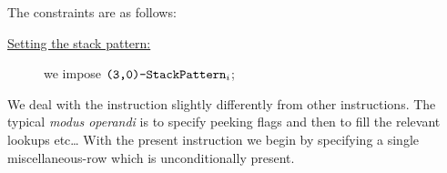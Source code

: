 \begin{center}
\end{center}
The constraints are as follows:
\begin{description}
	\item[\underline{Setting the stack pattern:}]
		we impose $\texttt{(3,0)-}\texttt{StackPattern}_{i}$;
\end{description}
We deal with the  instruction slightly differently from other instructions.
The typical \emph{modus operandi} is to specify peeking flags and then to fill the relevant lookups etc\dots{}
With the present instruction we begin by specifying a single miscellaneous-row which is unconditionally present.

